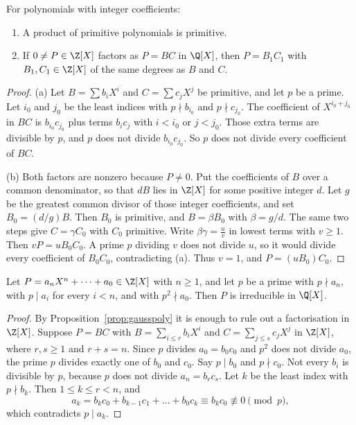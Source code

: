 \begin{proposition}\label{prop:gausspoly}
For polynomials with integer coefficients:
\begin{enumerate}[label=(\alph*)]
\item A product of primitive polynomials is primitive.
\item If $0\ne P\in\Z[X]$ factors as $P=BC$ in $\Q[X]$, then $P=B_1C_1$ with $B_1,C_1\in\Z[X]$ of the same degrees as $B$ and $C$.
\end{enumerate}
\end{proposition}
\begin{proof}
(a) Let $B=\sum b_iX^i$ and $C=\sum c_jX^j$ be primitive, and let $p$ be a prime. Let $i_0$ and $j_0$ be the least indices with $p\nmid b_{i_0}$ and $p\nmid c_{j_0}$. The coefficient of $X^{i_0+j_0}$ in $BC$ is $b_{i_0}c_{j_0}$ plus terms $b_ic_j$ with $i<i_0$ or $j<j_0$. Those extra terms are divisible by $p$, and $p$ does not divide $b_{i_0}c_{j_0}$. So $p$ does not divide every coefficient of $BC$.

(b) Both factors are nonzero because $P\ne0$. Put the coefficients of $B$ over a common denominator, so that $dB$ lies in $\Z[X]$ for some positive integer $d$. Let $g$ be the greatest common divisor of those integer coefficients, and set $B_0=(d/g)B$. Then $B_0$ is primitive, and $B=\beta B_0$ with $\beta=g/d$. The same two steps give $C=\gamma C_0$ with $C_0$ primitive. Write $\beta\gamma=\frac uv$ in lowest terms with $v\ge1$. Then $vP=uB_0C_0$. A prime $p$ dividing $v$ does not divide $u$, so it would divide every coefficient of $B_0C_0$, contradicting (a). Thus $v=1$, and $P=(uB_0)C_0$.
\end{proof}

\begin{theorem}\label{thm:eisenstein}
Let $P=a_nX^n+\dots+a_0\in\Z[X]$ with $n\ge1$, and let $p$ be a prime with $p\nmid a_n$, with $p\mid a_i$ for every $i<n$, and with $p^2\nmid a_0$. Then $P$ is irreducible in $\Q[X]$.
\end{theorem}
\begin{proof}
By Proposition~\ref{prop:gausspoly} it is enough to rule out a factorisation in $\Z[X]$. Suppose $P=BC$ with $B=\sum_{i\le r}b_iX^i$ and $C=\sum_{j\le s}c_jX^j$ in $\Z[X]$, where $r,s\ge1$ and $r+s=n$. Since $p$ divides $a_0=b_0c_0$ and $p^2$ does not divide $a_0$, the prime $p$ divides exactly one of $b_0$ and $c_0$. Say $p\mid b_0$ and $p\nmid c_0$. Not every $b_i$ is divisible by $p$, because $p$ does not divide $a_n=b_rc_s$. Let $k$ be the least index with $p\nmid b_k$. Then $1\le k\le r<n$, and
\[
a_k=b_kc_0+b_{k-1}c_1+\dots+b_0c_k\equiv b_kc_0\not\equiv0\pmod p,
\]
which contradicts $p\mid a_k$.
\end{proof}

